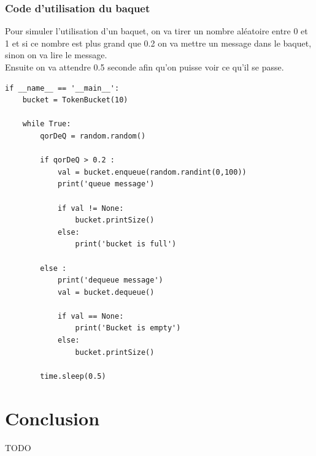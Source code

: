 \documentclass{article}
\begin{document}
\subsubsection{Code d'utilisation du baquet}

Pour simuler l'utilisation d'un baquet, on va tirer un nombre aléatoire entre 0 et 1 et si ce nombre est plus grand que 0.2 on va mettre un message dans le baquet, sinon on va lire le message.\\

Ensuite on va attendre 0.5 seconde afin qu'on puisse voir ce qu'il se passe.

\begin{lstlisting}
if __name__ == '__main__':
	bucket = TokenBucket(10)
	
	while True:
		qorDeQ = random.random()
		
		if qorDeQ > 0.2 :
			val = bucket.enqueue(random.randint(0,100))
			print('queue message')
			
			if val != None:
				bucket.printSize()
			else:
				print('bucket is full')
		
		else :
			print('dequeue message')
			val = bucket.dequeue()
		
			if val == None:
				print('Bucket is empty')
			else:
				bucket.printSize()
	
		time.sleep(0.5)
\end{lstlisting}

\section{Conclusion}
TODO
\end{document}
